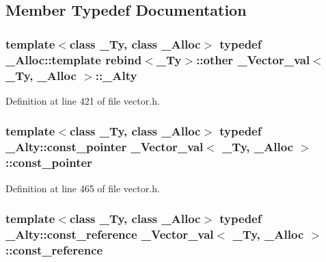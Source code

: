 \subsection{Member Typedef Documentation}
\hypertarget{class___vector__val_ad273d1146bf265f65e75133aa2f9986a}{
\subsubsection[{\+\_\+\+Alty}]{\setlength{\rightskip}{0pt plus 5cm}template$<$class \+\_\+\+Ty, class \+\_\+\+Alloc$>$ typedef \+\_\+\+Alloc\+::template rebind$<$\+\_\+\+Ty$>$\+::other {\bf \+\_\+\+Vector\+\_\+val}$<$ \+\_\+\+Ty, \+\_\+\+Alloc $>$\+::{\bf \+\_\+\+Alty}}}\label{class___vector__val_ad273d1146bf265f65e75133aa2f9986a}


Definition at line 421 of file vector.\+h.

\hypertarget{class___vector__val_ab8b3d3a2093e4799ac46bf479e8789bb}{
\subsubsection[{const\+\_\+pointer}]{\setlength{\rightskip}{0pt plus 5cm}template$<$class \+\_\+\+Ty, class \+\_\+\+Alloc$>$ typedef \+\_\+\+Alty\+::const\+\_\+pointer {\bf \+\_\+\+Vector\+\_\+val}$<$ \+\_\+\+Ty, \+\_\+\+Alloc $>$\+::{\bf const\+\_\+pointer}}}\label{class___vector__val_ab8b3d3a2093e4799ac46bf479e8789bb}


Definition at line 465 of file vector.\+h.

\hypertarget{class___vector__val_a0c18884755addbb2c0530338682d3506}{
\subsubsection[{const\+\_\+reference}]{\setlength{\rightskip}{0pt plus 5cm}template$<$class \+\_\+\+Ty, class \+\_\+\+Alloc$>$ typedef \+\_\+\+Alty\+::const\+\_\+reference {\bf \+\_\+\+Vector\+\_\+val}$<$ \+\_\+\+Ty, \+\_\+\+Alloc $>$\+::{\bf const\+\_\+reference}}}\label{class___vector__val_a0c18884755addbb2c0530338682d3506}


